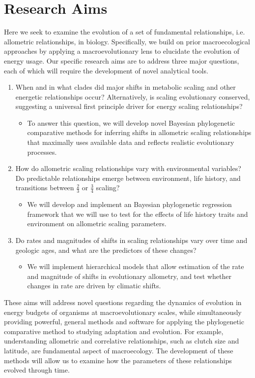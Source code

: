 \documentclass[10pt, a4paper]{article}
\begin{document}
\section*{Research Aims}
Here we seek to examine the evolution of a set of fundamental relationships, i.e. allometric relationships, in biology.  Specifically, we build on prior macroecological approaches by applying a macroevolutionary lens to elucidate the evolution of energy usage. Our specific research aims are to address three major questions, each of which will require the development of novel analytical tools.
\begin{enumerate}
\item When and in what clades did major shifts in metabolic scaling and other energetic relationships occur? Alternatively, is scaling evolutionary conserved, suggesting a universal first principle driver for energy scaling relationships?
\begin{itemize}
\item To answer this question, we will develop novel Bayesian phylogenetic comparative methods for inferring shifts in allometric scaling relationships that maximally uses available data and reflects realistic evolutionary processes.
\end{itemize}
\item How do allometric scaling relationships vary with environmental variables? Do predictable relationships emerge between environment, life history, and transitions between  $\frac{2}{3}$ or $\frac{3}{4}$ scaling?
\begin{itemize}
\item We will develop and implement an Bayesian phylogenetic regression framework that we will use to test for the effects of life history traits and environment on allometric scaling parameters. 
	\end{itemize}
\item Do rates and magnitudes of shifts in scaling relationships vary over time and geologic ages, and what are the predictors of these changes?
	\begin{itemize}
\item We will implement hierarchical models that allow estimation of the rate and magnitude of shifts in evolutionary allometry, and test whether changes in rate are driven by climatic shifts.
	\end{itemize}
\end{enumerate}

These aims will address novel questions regarding the dynamics of evolution in energy budgets of organisms at macroevolutionary scales, while simultaneously providing powerful, general methods and software for applying the phylogenetic comparative method to studying adaptation and evolution. For example, understanding allometric and correlative relationships, such as clutch size and latitude, are fundamental aspect of macroecology. The development of these methods will allow us to examine how the parameters of these relationships evolved through time.
\end{document}
